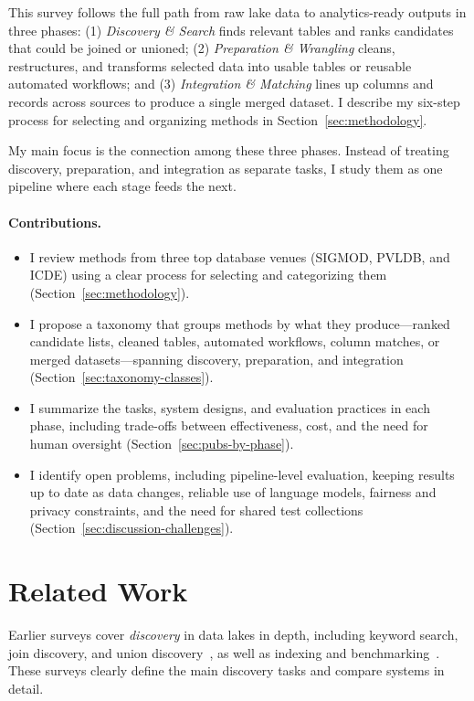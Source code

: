 \documentclass[sigconf]{acmart}
\begin{document}
This survey follows the full path from raw lake data to analytics-ready outputs in three phases:
(1) \emph{Discovery \& Search} finds relevant tables and ranks candidates that could be joined or unioned;
(2) \emph{Preparation \& Wrangling} cleans, restructures, and transforms selected data into usable tables or reusable automated workflows; and
(3) \emph{Integration \& Matching} lines up columns and records across sources to produce a single merged dataset.
I describe my six-step process for selecting and organizing methods in Section~\ref{sec:methodology}.

My main focus is the connection among these three phases. Instead of treating discovery, preparation, and integration as separate tasks, I study them as one pipeline where each stage feeds the next.

\paragraph{Contributions.}
\begin{itemize}
  \item I review methods from three top database venues (SIGMOD, PVLDB, and ICDE) using a clear process for selecting and categorizing them (Section~\ref{sec:methodology}).
  \item I propose a taxonomy that groups methods by what they produce---ranked candidate lists, cleaned tables, automated workflows, column matches, or merged datasets---spanning discovery, preparation, and integration (Section~\ref{sec:taxonomy-classes}).
  \item I summarize the tasks, system designs, and evaluation practices in each phase, including trade-offs between effectiveness, cost, and the need for human oversight (Section~\ref{sec:pubs-by-phase}).
  \item I identify open problems, including pipeline-level evaluation, keeping results up to date as data changes, reliable use of language models, fairness and privacy constraints, and the need for shared test collections (Section~\ref{sec:discussion-challenges}).
\end{itemize}


\section{Related Work}
\label{sec:related}
Earlier surveys cover \emph{discovery} in data lakes in depth, including keyword search, join discovery, and union discovery~\cite{10.1145/3555041.3589409}, as well as indexing and benchmarking~\cite{10.14778/3750601.3750694}. These surveys clearly define the main discovery tasks and compare systems in detail.
\end{document}
